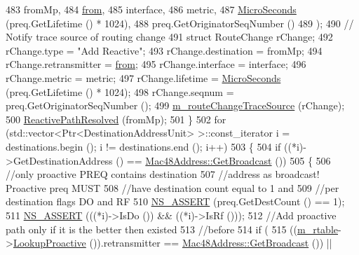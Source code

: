 \begin{DoxyCode}
483         fromMp,
484         \hyperlink{lte__amc_8m_a1b4c81ff74eb1a626b5ade44c81004b3}{from},
485         interface,
486         metric,
487         \hyperlink{group__timecivil_ga17465a639c8d1464e76538afdd78a9f0}{MicroSeconds} (preq.GetLifetime () * 1024),
488         preq.GetOriginatorSeqNumber ()
489         );
490       \textcolor{comment}{// Notify trace source of routing change}
491       \textcolor{keyword}{struct }RouteChange rChange;
492       rChange.type = \textcolor{stringliteral}{"Add Reactive"};
493       rChange.destination = fromMp;
494       rChange.retransmitter = \hyperlink{lte__amc_8m_a1b4c81ff74eb1a626b5ade44c81004b3}{from};
495       rChange.interface = interface;
496       rChange.metric = metric;
497       rChange.lifetime = \hyperlink{group__timecivil_ga17465a639c8d1464e76538afdd78a9f0}{MicroSeconds} (preq.GetLifetime () * 1024);
498       rChange.seqnum = preq.GetOriginatorSeqNumber ();
499       \hyperlink{classns3_1_1dot11s_1_1HwmpProtocol_aff5ca87b57430809a6b6ee25fa526948}{m\_routeChangeTraceSource} (rChange);
500       \hyperlink{classns3_1_1dot11s_1_1HwmpProtocol_ac9ee2097883725cf40dd05537e12a9eb}{ReactivePathResolved} (fromMp);
501     \}
502   \textcolor{keywordflow}{for} (std::vector<Ptr<DestinationAddressUnit> >::const\_iterator i = destinations.begin (); i != 
      destinations.end (); i++)
503     \{
504       \textcolor{keywordflow}{if} ((*i)->GetDestinationAddress () == \hyperlink{classns3_1_1Mac48Address_a55156e302c6bf950c0b558365adbde84}{Mac48Address::GetBroadcast} ())
505         \{
506           \textcolor{comment}{//only proactive PREQ contains destination}
507           \textcolor{comment}{//address as broadcast! Proactive preq MUST}
508           \textcolor{comment}{//have destination count equal to 1 and}
509           \textcolor{comment}{//per destination flags DO and RF}
510           \hyperlink{assert_8h_a6dccdb0de9b252f60088ce281c49d052}{NS\_ASSERT} (preq.GetDestCount () == 1);
511           \hyperlink{assert_8h_a6dccdb0de9b252f60088ce281c49d052}{NS\_ASSERT} (((*i)->IsDo ()) && ((*i)->IsRf ()));
512           \textcolor{comment}{//Add proactive path only if it is the better then existed}
513           \textcolor{comment}{//before}
514           \textcolor{keywordflow}{if} (
515             ((\hyperlink{classns3_1_1dot11s_1_1HwmpProtocol_a12fda0e3e5a400888c8ba1a87c1a7216}{m\_rtable}->\hyperlink{classns3_1_1dot11s_1_1HwmpRtable_ad4bed27ab37ab1bc606802b763225a23}{LookupProactive} ()).retransmitter == 
      \hyperlink{classns3_1_1Mac48Address_a55156e302c6bf950c0b558365adbde84}{Mac48Address::GetBroadcast} ()) ||

\end{DoxyCode}

